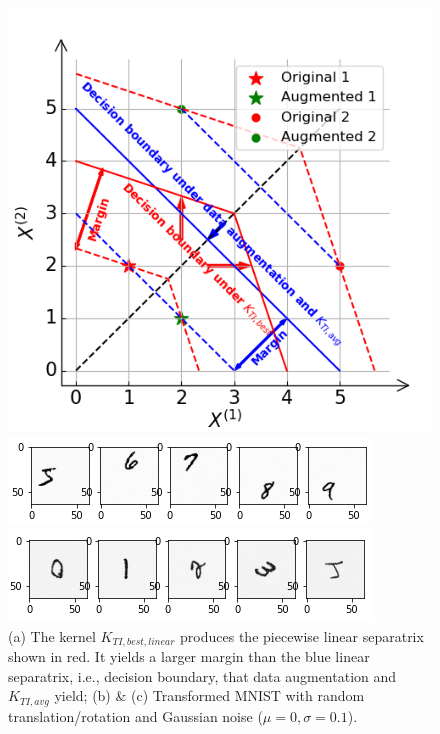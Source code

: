 \documentclass{article}
\theoremstyle{plain}
\theoremstyle{definition}
\theoremstyle{remark}
\begin{document}
\begin{figure}
  \centering
  \begin{minipage}[t]{0.4\linewidth}
    \includegraphics[width=\textwidth]{figure/toy_example.png}
    \subcaption{}
  \end{minipage}
  \begin{minipage}[t]{0.45\linewidth}
    \vspace{-4.5cm}
    \centering
    \begin{minipage}[t]{\linewidth}
      \includegraphics[width=\textwidth]{figure/TI_MNIST.png}
    \end{minipage}
    \begin{minipage}[b]{\linewidth}
      \includegraphics[width=\textwidth]{figure/RI_MNIST.png}
    \end{minipage}
  \end{minipage}
  \caption{(a) The kernel $K_{TI,best,linear}$ produces the piecewise linear separatrix shown in red. It yields a larger margin than the blue linear separatrix, i.e., decision boundary, that data augmentation and $K_{TI,avg}$ yield; (b) \& (c) Transformed MNIST with random translation/rotation and Gaussian noise ($\mu = 0, \sigma = 0.1$).}
 \label{fig:toy TI}
\end{figure}
\end{document}
